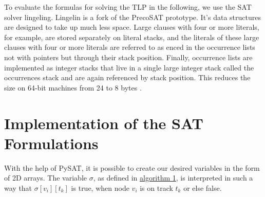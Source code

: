 \documentclass[bachelor, english]{algothesis}
\begin{document}
To evaluate the formulas for solving the TLP in the following, we use the SAT solver lingeling. Lingelin is a fork of the PrecoSAT prototype. It's data structures are designed to take up much less space. Large clauses with four or more literals, for example, are stored separately on literal stacks, and the literals of these large clauses with four or more literals are referred to as enced in the occurrence lists not with pointers but through their stack position. Finally, occurrence lists are implemented as integer stacks that live in a single large integer stack called the occurrences stack and are again referenced by stack position. This reduces the size on 64-bit machines from 24 to 8 bytes \cite{LingeLing}.

\section{Implementation of the SAT Formulations}
With the help of PySAT, it is possible to create our desired variables in the form of 2D arrays. The variable $\sigma$, as defined in \hyperlink{alg:sigma}{algorithm 1}, is interpreted in such a way that $\sigma[v_i][t_k]$ is true, when node $v_i$ is on track $t_k$ or else false.
\end{document}

